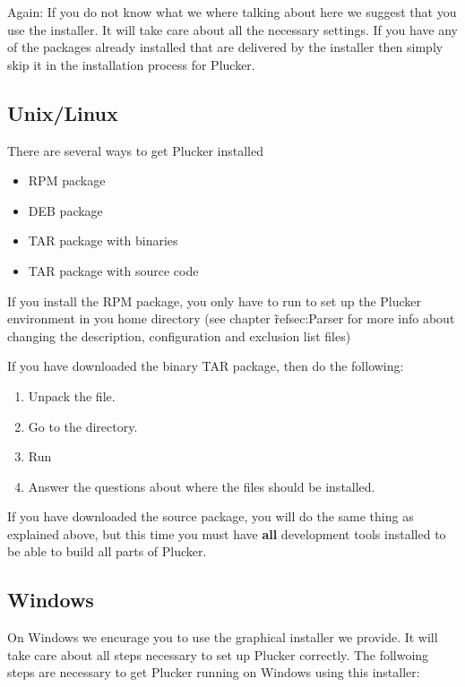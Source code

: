 Again: If you do not know what we where talking about here we suggest
that you use the installer. It will take care about all the necessary
settings. If you have any of the packages already installed that are
delivered by the installer  then simply skip it in the installation
process for Plucker.

\subsection{Unix/Linux}

There are several ways to get Plucker installed

\begin{itemize}
\item RPM package
\item DEB package
\item TAR package with binaries
\item TAR package with source code
\end{itemize}

If you install the RPM package, you only have to run
 to set up the Plucker environment in you home
directory (see chapter \~ref{sec:Parser} for more info about changing
the description, configuration and exclusion list files)

If you have downloaded the binary TAR package, then do the following:

\begin{enumerate}
\item Unpack the file.
\item Go to the  directory.
\item Run 
\item Answer the questions about where the files should be installed.
\end{enumerate}

If you have downloaded the source package, you will do the same thing as
explained above, but this time you must have \textbf{all} development 
tools installed to be able to build all parts of Plucker.

\subsection{Windows}

On Windows we encurage you to use the graphical installer we provide.
It will take care about all steps necessary to set up Plucker
correctly. The follwoing steps are necessary to get Plucker running on
Windows using this installer:

